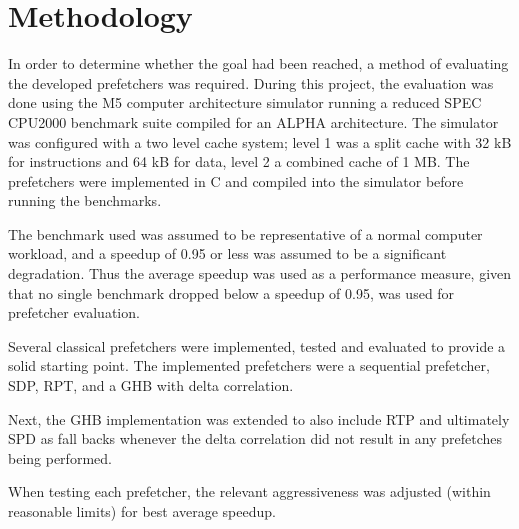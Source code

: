 \section{Methodology}
\label{sec:methodology}

In order to determine whether the goal had been reached, a method of evaluating the developed prefetchers was required.
During this project, the evaluation was done using the M5 computer architecture simulator running a reduced SPEC CPU2000 benchmark suite compiled for an ALPHA architecture.
The simulator was configured with a two level cache system; level 1 was a split cache with 32 kB for instructions and 64 kB for data, level 2 a combined cache of 1 MB.
The prefetchers were implemented in C and compiled into the simulator before running the benchmarks.


The benchmark used was assumed to be representative of a normal computer workload, and a speedup of 0.95 or less was assumed to be a significant degradation.
Thus the average speedup was used as a performance measure, given that no single benchmark dropped below a speedup of 0.95, was used for prefetcher evaluation.

Several classical prefetchers were implemented, tested and evaluated to provide a solid starting point.
The implemented prefetchers were a sequential prefetcher, SDP, RPT, and a GHB with delta correlation.

Next, the GHB implementation was extended to also include RTP and ultimately SPD as fall backs whenever the delta correlation did not result in any prefetches being performed.

When testing each prefetcher, the relevant aggressiveness was adjusted (within reasonable limits) for best average speedup.
